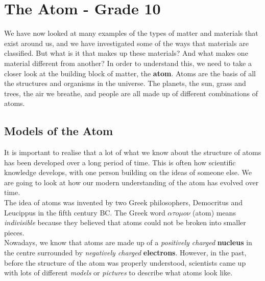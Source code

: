 \chapter{The Atom - Grade 10}
\label{chap:atom}

We have now looked at many  examples  of the types of matter and materials that exist around us, and we have investigated some of the ways that materials are classified. But what is it that makes up these materials? And what makes one material different from another? In order to understand this, we need to take a closer look at the building block of matter, the \textbf{atom}. Atoms are the basis of all the structures and organisms in the universe. The planets, the sun, grass and trees, the air we breathe, and people are all made up of different combinations of atoms.




\section{Models of the Atom}
\label{sec:atom:models}

It is important to realise that a lot of what we know about the structure of atoms has been developed over a long period of time. This is often how scientific knowledge develops, with one person building on the ideas of someone else. We are going to look at how our modern understanding of the atom has evolved over time.\\

The idea of atoms was invented by two Greek philosophers, Democritus and Leucippus in the fifth century BC. The Greek word $\alpha\tau o\mu o\nu$ (atom) means \emph{indivisible} because they believed that atoms could not be broken into smaller pieces.\\

Nowadays, we know that atoms are made up of a \emph{positively charged} \textbf{nucleus} in the centre 
surrounded by \emph{negatively charged} \textbf{electrons}. However, in the past, before the structure of the atom was properly understood, scientists came up with lots of different \emph{models} or \emph{pictures} to describe what atoms look like. 


